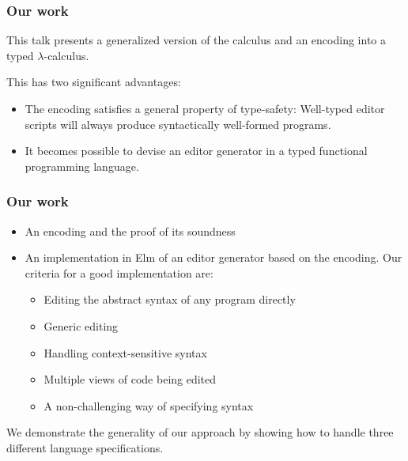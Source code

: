 \documentclass[t,24pt,serif,aspectratio=169]{beamer}
\begin{document}
\begin{frame}[hvid]
    \frametitle{Our work}

    This talk presents a generalized version of the calculus and an
    encoding into a typed $\lambda$-calculus.

        \bigskip

    This has two significant advantages:
    
    \begin{itemize}
\item The encoding satisfies \alert{a general property of type-safety}:
    Well-typed editor scripts will always produce syntactically
    well-formed programs.
    
  \item It becomes possible to devise an editor generator in a typed
    functional programming language.
    \end{itemize}
    
\end{frame}

\begin{frame}
  \frametitle{Our work}

  \begin{itemize}
  \item An encoding and the proof of its soundness
    
  \item An implementation in Elm of an editor generator based on the
    encoding. Our criteria for a good implementation are:
              \begin{itemize}
                  \pause
                  \item Editing the abstract syntax of any program directly
                        \pause
                  \item Generic editing
                        \pause
                  \item Handling context-sensitive syntax
                        \pause
                  \item Multiple views of code being edited
                        \pause
                  \item A non-challenging way of specifying syntax
              \end{itemize}
            \end{itemize}

            We demonstrate the generality of our approach by showing
            how to handle three different language specifications.
\end{frame}
\end{document}
